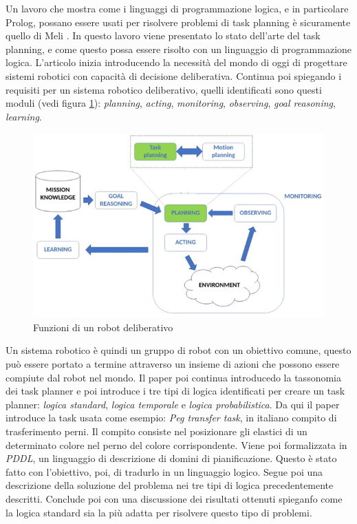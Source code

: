 Un lavoro che mostra come i linguaggi di programmazione logica, e in particolare Prolog, possano essere usati per risolvere problemi di task planning è sicuramente quello di Meli \cite{meli2023logic}. In questo lavoro viene presentato lo stato dell'arte del task planning, e come questo possa essere risolto con un linguaggio di programmazione logica.
L'articolo inizia introducendo la necessità del mondo di oggi di progettare sistemi robotici con capacità di decisione deliberativa. 
Continua poi spiegando i requisiti per un sistema robotico deliberativo, quelli identificati sono questi moduli (vedi figura \ref{fig:delrob}): 
    \textit{planning},
    \textit{acting},
    \textit{monitoring},
    \textit{observing},
    \textit{goal reasoning},
    \textit{learning}.
\begin{figure}[h!]
    \centering
    \includegraphics[scale=0.55]{images/deliberativerobot.png}
    \caption{Funzioni di un robot deliberativo \cite{meli2023logic}}
    \label{fig:delrob}
\end{figure}
Un sistema robotico è quindi un gruppo di robot con un obiettivo comune, questo può essere portato a termine attraverso un insieme di azioni che possono essere compiute dal robot nel mondo.
Il paper poi continua introducedo la tassonomia dei task planner e poi introduce i tre tipi di logica identificati per creare un task planner: \textit{logica standard}, \textit{logica temporale} e \textit{logica probabilistica}.
Da qui il paper introduce la task usata come esempio: \textit{Peg transfer task}, in italiano compito di trasferimento perni.
Il compito consiste nel posizionare gli elastici di un determinato colore nel perno del colore corrispondente.
Viene poi formalizzata in \textit{PDDL}, un linguaggio di descrizione di domini di pianificazione. Questo è stato fatto con l'obiettivo, poi, di tradurlo in un linguaggio logico.
Segue poi una descrizione della soluzione del problema nei tre tipi di logica precedentemente descritti. Conclude poi con una discussione dei risultati ottenuti spieganfo come la logica standard sia la più adatta per risolvere questo tipo di problemi.

